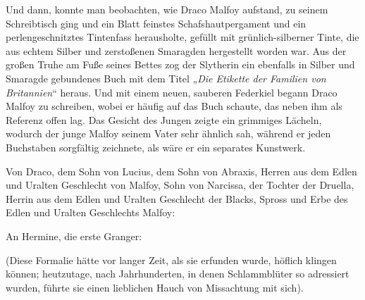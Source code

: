 Und dann, konnte man beobachten, wie Draco Malfoy aufstand, zu seinem Schreibtisch ging und ein Blatt feinstes Schafshautpergament und ein perlengeschnitztes Tintenfass herausholte, gefüllt mit grünlich-silberner Tinte, die aus echtem Silber und zerstoßenen Smaragden hergestellt worden war. Aus der großen Truhe am Fuße seines Bettes zog der Slytherin ein ebenfalls in Silber und Smaragde gebundenes Buch mit dem Titel „\emph{Die Etikette der Familien von Britannien}“ heraus. Und mit einem neuen, sauberen Federkiel begann Draco Malfoy zu schreiben, wobei er häufig auf das Buch schaute, das neben ihm als Referenz offen lag. Das Gesicht des Jungen zeigte ein grimmiges Lächeln, wodurch der junge Malfoy seinem Vater sehr ähnlich sah, während er jeden Buchstaben sorgfältig zeichnete, als wäre er ein separates Kunstwerk.

\begin{writtenNote}
Von Draco, dem Sohn von Lucius, dem Sohn von Abraxis, Herren aus dem Edlen und Uralten Geschlecht von Malfoy, Sohn von Narcissa, der Tochter der Druella, Herrin aus dem Edlen und Uralten Geschlecht der Blacks, Spross und Erbe des Edlen und Uralten Geschlechts Malfoy:

An Hermine, die erste Granger:
\end{writtenNote}

(Diese Formalie hätte vor langer Zeit, als sie erfunden wurde, höflich klingen können; heutzutage, nach Jahrhunderten, in denen Schlammblüter so adressiert wurden, führte sie einen lieblichen Hauch von Missachtung mit sich).

